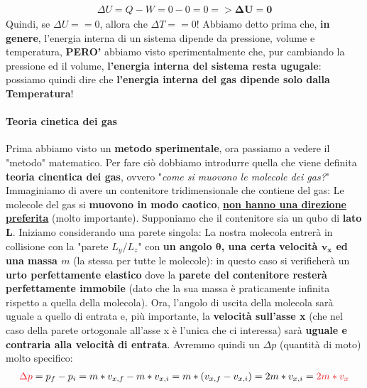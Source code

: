                     \begin{align*}
                        \Delta U = Q-W = 0-0 = 0 => \mathbf{\Delta U = 0}
                    \end{align*}
                    Quindi, se $\Delta U == 0$, allora che $\Delta T == 0$!
                    Abbiamo detto prima che, \textbf{in genere}, l'energia interna di un sistema dipende da pressione, volume e temperatura, \textbf{PERO'} abbiamo visto sperimentalmente che, pur cambiando la pressione ed il volume, \textbf{l'energia interna del sistema resta ugugale}: possiamo quindi dire che \textbf{l'energia interna del gas dipende solo dalla Temperatura}!


                \paragraph{Teoria cinetica dei gas}
                    Prima abbiamo visto un \textbf{metodo sperimentale}, ora passiamo a vedere il "metodo" matematico. Per fare ciò dobbiamo introdurre quella che viene definita \textbf{teoria cinentica dei gas}, ovvero "\textit{come si muovono le molecole dei gas?}" Immaginiamo di avere un contenitore tridimensionale che contiene del gas:
                    Le molecole del gas si \textbf{muovono in modo caotico}, \textbf{\underline{non hanno una direzione preferita}} (molto importante). Supponiamo che il contenitore sia un qubo di \textbf{lato $\mathbf{L}$}. Iniziamo considerando una parete singola:
                    La nostra molecola entrerà in collisione con la "parete $L_y/L_z$" con \textbf{un angolo $\mathbf{\theta}$, una certa velocità $\mathbf{v_x}$ ed una massa $m$} (la stessa per tutte le molecole): in questo caso si verificherà un \textbf{urto perfettamente elastico} dove la \textbf{parete del contenitore resterà perfettamente immobile} (dato che la sua massa è praticamente infinita rispetto a quella della molecola). Ora, l'angolo di uscita della molecola sarà uguale a quello di entrata e, più importante, la \textbf{velocità sull'asse x} (che nel caso della parete ortogonale all'asse x è l'unica che ci interessa) sarà \textbf{uguale e contraria alla velocità di entrata}. Avremmo quindi un $\Delta p$ (quantità di moto) molto specifico:
                    \begin{align*}
                        \textcolor{Red}{\Delta p} = p_f-p_i = m*v_{x, f}-m*v_{x, i}=m*(v_{x, f}-v_{x, i}) =2m*v_{x, i}= \textcolor{Red}{2m*v_{x}}
                    \end{align*}
